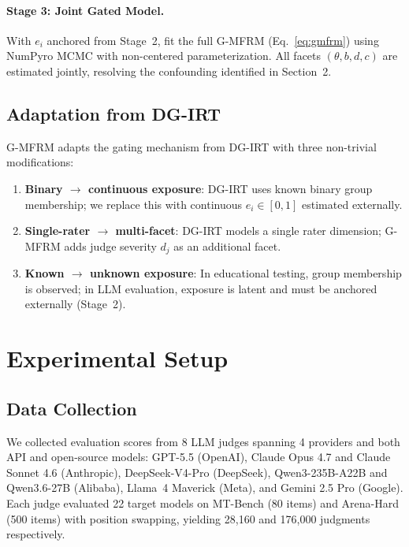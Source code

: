 \documentclass[11pt,a4paper]{article}
\begin{document}
\paragraph{Stage 3: Joint Gated Model.} With $e_i$ anchored from Stage~2, fit the full G-MFRM (Eq.~\ref{eq:gmfrm}) using NumPyro MCMC with non-centered parameterization. All facets $(\theta, b, d, c)$ are estimated jointly, resolving the confounding identified in Section~2.

\subsection{Adaptation from DG-IRT}

G-MFRM adapts the gating mechanism from DG-IRT \citep{robitzsch2020dgirt} with three non-trivial modifications:
\begin{enumerate}[nosep]
    \item \textbf{Binary $\to$ continuous exposure}: DG-IRT uses known binary group membership; we replace this with continuous $e_i \in [0,1]$ estimated externally.
    \item \textbf{Single-rater $\to$ multi-facet}: DG-IRT models a single rater dimension; G-MFRM adds judge severity $d_j$ as an additional facet.
    \item \textbf{Known $\to$ unknown exposure}: In educational testing, group membership is observed; in LLM evaluation, exposure is latent and must be anchored externally (Stage~2).
\end{enumerate}

\section{Experimental Setup}

\subsection{Data Collection}
\label{sec:data}

We collected evaluation scores from 8 LLM judges spanning 4 providers and both API and open-source models: GPT-5.5 (OpenAI), Claude Opus 4.7 and Claude Sonnet 4.6 (Anthropic), DeepSeek-V4-Pro (DeepSeek), Qwen3-235B-A22B and Qwen3.6-27B (Alibaba), Llama~4 Maverick (Meta), and Gemini 2.5 Pro (Google). Each judge evaluated 22 target models on MT-Bench (80 items) and Arena-Hard (500 items) with position swapping, yielding 28,160 and 176,000 judgments respectively.
\end{document}
